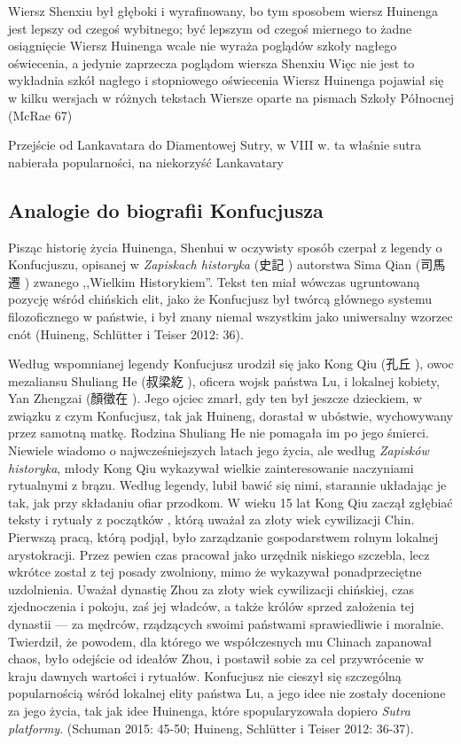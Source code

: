 Wiersz Shenxiu był głęboki i wyrafinowany, bo tym sposobem wiersz Huinenga jest lepszy od czegoś wybitnego; być lepszym od czegoś miernego to żadne osiągnięcie
Wiersz Huinenga wcale nie wyraża poglądów szkoły nagłego oświecenia, a jedynie zaprzecza poglądom wiersza Shenxiu
Więc nie jest to wykładnia szkół nagłego i stopniowego oświecenia
Wiersz Huinenga pojawiał się w kilku wersjach w różnych tekstach
Wiersze oparte na pismach Szkoły Północnej (McRae 67)

Przejście od Lankavatara do Diamentowej Sutry, w VIII w. ta właśnie sutra nabierała popularności, na niekorzyść Lankavatary
\fi
\subsection{Analogie do biografii Konfucjusza}
Pisząc historię życia Huinenga, Shenhui w oczywisty sposób czerpał z legendy o Konfucjuszu, opisanej w \textit{Zapiskach historyka} (史記 ) autorstwa Sima Qian (司馬遷 ) zwanego ,,Wielkim Historykiem''. Tekst ten miał wówczas ugruntowaną pozycję wśród chińskich elit, jako że Konfucjusz był twórcą głównego systemu filozoficznego w państwie, i był znany niemal wszystkim jako uniwersalny wzorzec cnót (Huineng, Schlütter i Teiser 2012: 36).

Według wspomnianej legendy Konfucjusz urodził się jako Kong Qiu (孔丘 ), owoc mezaliansu Shuliang He (叔梁紇 ), oficera wojsk państwa Lu, i lokalnej kobiety, Yan Zhengzai (顏徵在 ). Jego ojciec zmarł, gdy ten był jeszcze dzieckiem, w związku z czym Konfucjusz, tak jak Huineng, dorastał w ubóstwie, wychowywany przez samotną matkę. Rodzina Shuliang He nie pomagała im po jego śmierci. Niewiele wiadomo o najwcześniejszych latach jego życia, ale według \textit{Zapisków historyka}, młody Kong Qiu wykazywał wielkie zainteresowanie naczyniami rytualnymi z brązu. Według legendy, lubił bawić się nimi, starannie układając je tak, jak przy składaniu ofiar przodkom. W wieku 15 lat Kong Qiu zaczął zgłębiać teksty i rytuały z początków , którą uważał za złoty wiek cywilizacji Chin. Pierwszą pracą, którą podjął, było zarządzanie gospodarstwem rolnym lokalnej arystokracji. Przez pewien czas pracował jako urzędnik niskiego szczebla, lecz wkrótce został z tej posady zwolniony, mimo że wykazywał ponadprzeciętne uzdolnienia. Uważał dynastię Zhou za złoty wiek cywilizacji chińskiej, czas zjednoczenia i pokoju, zaś jej władców, a także królów sprzed założenia tej dynastii --- za mędrców, rządzących swoimi państwami sprawiedliwie i moralnie. Twierdził, że powodem, dla którego we współczesnych mu Chinach zapanował chaos, było odejście od ideałów Zhou, i postawił sobie za cel przywrócenie w kraju dawnych wartości i rytuałów. Konfucjusz nie cieszył się szczególną popularnością wśród lokalnej elity państwa Lu, a jego idee nie zostały docenione za jego życia, tak jak idee Huinenga, które spopularyzowała dopiero \textit{Sutra platformy}. (Schuman 2015: 45-50; Huineng, Schlütter i Teiser 2012: 36-37).


